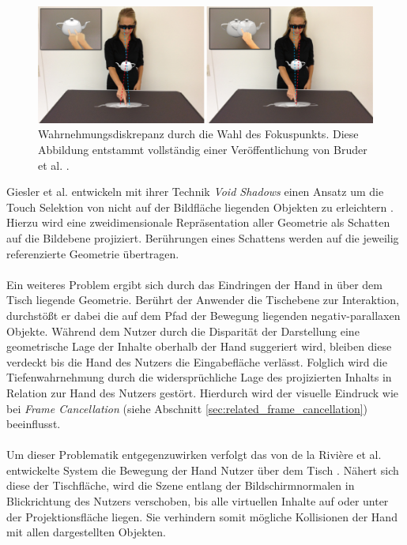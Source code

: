 \begin{figure}
	\begin{center}
		\includegraphics[width=12cm]{img/fokussierung.pdf}
	\end{center}
	\caption{Wahrnehmungsdiskrepanz durch die Wahl des Fokuspunkts. Diese Abbildung entstammt vollständig einer Veröffentlichung von Bruder et al. \cite{bruder:2013}.}
	\label{fig:fokussierung}
\end{figure}

Giesler et al. entwickeln mit ihrer Technik \emph{Void Shadows} einen Ansatz um die Touch Selektion von nicht auf der Bildfläche liegenden Objekten zu erleichtern \cite{giesler:2014}. Hierzu wird eine zweidimensionale Repräsentation aller Geometrie als Schatten auf die Bildebene projiziert. Berührungen eines Schattens werden auf die jeweilig referenzierte Geometrie übertragen.
\\\\
Ein weiteres Problem ergibt sich durch das Eindringen der Hand in über dem Tisch liegende Geometrie. Berührt der Anwender die Tischebene zur Interaktion, durchstößt er dabei die auf dem Pfad der Bewegung liegenden negativ-parallaxen Objekte. Während dem Nutzer durch die Disparität der Darstellung eine geometrische Lage der Inhalte oberhalb der Hand suggeriert wird, bleiben diese verdeckt bis die Hand des Nutzers die Eingabefläche verlässt. Folglich wird die Tiefenwahrnehmung durch die widersprüchliche Lage des projizierten Inhalts in Relation zur Hand des Nutzers gestört. Hierdurch wird der visuelle Eindruck wie bei \emph{Frame Cancellation} (siehe Abschnitt \ref{sec:related_frame_cancellation})  beeinflusst.
\\\\
Um dieser Problematik entgegenzuwirken verfolgt das von de la Rivière et al. entwickelte System die Bewegung der Hand Nutzer über dem Tisch \cite{delariviere:2010}. Nähert sich diese der Tischfläche, wird die Szene entlang der Bildschirmnormalen in Blickrichtung des Nutzers verschoben, bis alle virtuellen Inhalte auf oder unter der Projektionsfläche liegen. Sie verhindern somit mögliche Kollisionen der Hand mit allen dargestellten Objekten.


